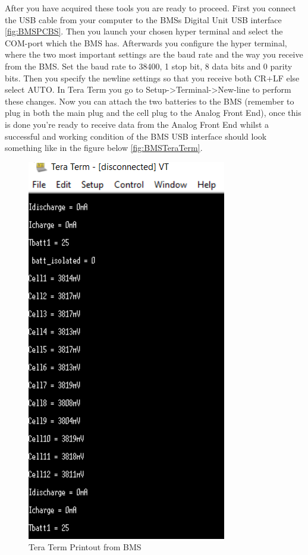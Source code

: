 After you have acquired these tools you are ready to proceed. First you connect the USB cable from your computer to the BMSs Digital Unit USB interface \vref{fig:BMSPCBS}. Then you launch your chosen hyper terminal and select the COM-port which the BMS has. Afterwards you configure the hyper terminal, where the two most important settings are the baud rate and the way you receive from the BMS. Set the baud rate to 38400, 1 stop bit, 8 data bits and 0 parity bits. Then you specify the newline settings so that you receive both CR+LF else select AUTO. In Tera Term you go to Setup->Terminal->New-line to perform these changes. 
Now you can attach the two batteries to the BMS (remember to plug in both the main plug and the cell plug to the Analog Front End), once this is done you're ready to receive data from the Analog Front End whilst a successful and working condition of the BMS USB interface should look something like in the figure below \vref{fig:BMSTeraTerm}. 
\begin{figure}[H]
	\centering
	\includegraphics[width=0.6\linewidth]{Hardware/Pictures/BMS_teraterm}
	\caption{Tera Term Printout from BMS}
	\label{fig:BMSTeraTerm}
\end{figure}

